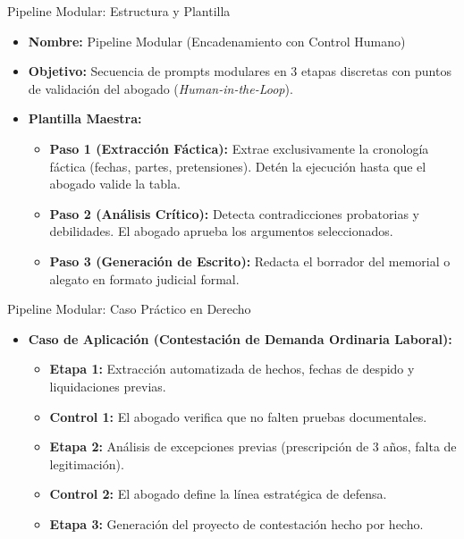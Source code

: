 \documentclass[aspectratio=169]{beamer}
\begin{document}
\begin{frame}{Pipeline Modular: Estructura y Plantilla}


\begin{itemize}
  \item \textbf{Nombre:} Pipeline Modular (Encadenamiento con Control Humano)
  \item \textbf{Objetivo:} Secuencia de prompts modulares en 3 etapas discretas con puntos de validación del abogado (\textit{Human-in-the-Loop}).
  \item \textbf{Plantilla Maestra:}
  \begin{itemize}
    \item \textbf{Paso 1 (Extracción Fáctica):} Extrae exclusivamente la cronología fáctica (fechas, partes, pretensiones). Detén la ejecución hasta que el abogado valide la tabla.
    \item \textbf{Paso 2 (Análisis Crítico):} Detecta contradicciones probatorias y debilidades. El abogado aprueba los argumentos seleccionados.
    \item \textbf{Paso 3 (Generación de Escrito):} Redacta el borrador del memorial o alegato en formato judicial formal.
  \end{itemize}
\end{itemize}
\end{frame}

\begin{frame}{Pipeline Modular: Caso Práctico en Derecho}


\begin{itemize}
  \item \textbf{Caso de Aplicación (Contestación de Demanda Ordinaria Laboral):}
  \begin{itemize}
    \item \textbf{Etapa 1:} Extracción automatizada de hechos, fechas de despido y liquidaciones previas.
    \item \textbf{Control 1:} El abogado verifica que no falten pruebas documentales.
    \item \textbf{Etapa 2:} Análisis de excepciones previas (prescripción de 3 años, falta de legitimación).
    \item \textbf{Control 2:} El abogado define la línea estratégica de defensa.
    \item \textbf{Etapa 3:} Generación del proyecto de contestación hecho por hecho.
  \end{itemize}
\end{itemize}
\end{frame}
\end{document}
